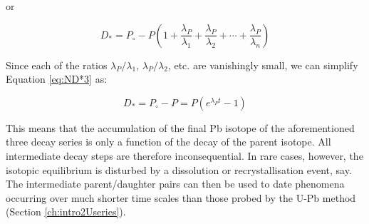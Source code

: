 or

\begin{equation}
D_* = P_\circ - P \left( 1 + \frac{\lambda_P}{\lambda_1} + 
\frac{\lambda_P}{\lambda_2} + \cdots + \frac{\lambda_P}{\lambda_n}\right)
\label{eq:ND*3}
\end{equation}

Since each of the ratios $\lambda_P/\lambda_1$, $\lambda_P/\lambda_2$,
etc.  are vanishingly small, we can simplify Equation \ref{eq:ND*3}
as:

\begin{equation}
D_* = P_\circ - P = P \left( e^{\lambda_P t} -1 \right)
\label{eq:ND*4}
\end{equation}

This means that the accumulation of the final Pb isotope of the
aforementioned three decay series is only a function of the decay of
the parent isotope.  All intermediate decay steps are therefore
inconsequential. In rare cases, however, the isotopic equilibrium is
disturbed by a dissolution or recrystallisation event, say. The
intermediate parent/daughter pairs can then be used to date phenomena
occurring over much shorter time scales than those probed by the U-Pb
method (Section \ref{ch:intro2Useries}).

